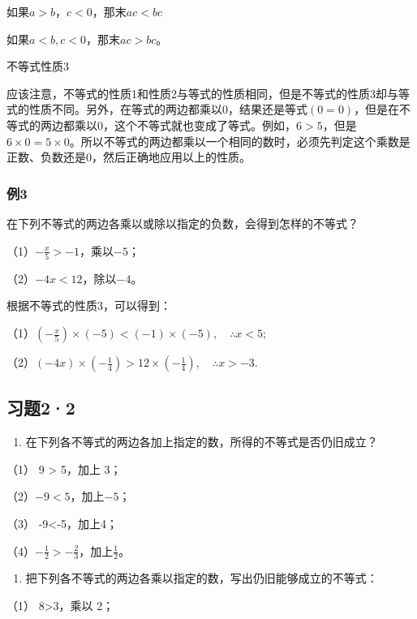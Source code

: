 如果\(a > b\)，\(c < 0\)，那末\(ac < bc\)

如果\(a < b, c < 0\)，那末\(ac > bc\)。

不等式性质3

应该注意，不等式的性质1和性质2与等式的性质相同，但是不等式的性质3却与等式的性质不同。另外，在等式的两边都乘以0，结果还是等式\((0 = 0)\)，但是在不等式的两边都乘以0，这个不等式就也变成了等式。例如，\(6 > 5\)，但是\(6 \times 0 = 5 \times 0\)。所以不等式的两边都乘以一个相同的数时，必须先判定这个乘数是正数、负数还是0，然后正确地应用以上的性质。

\subsubsection{例3}

在下列不等式的两边各乘以或除以指定的负数，会得到怎样的不等式？

（1）\(-\frac{x}{5} > -1\)，乘以\(-5\)；

（2）\(-4x < 12\)，除以\(-4\)。

 根据不等式的性质3，可以得到：

（1）\(\left(-\frac{x}{5}\right)\times(-5) < (-1) \times (-5), \quad \therefore x < 5;\)

（2）\((-4x) \times \left(-\frac{1}{4}\right) > 12 \times \left(-\frac{1}{4}\right), \quad \therefore x > -3.\)

\subsection{习题2·2}

\begin{enumerate}
\item
  在下列各不等式的两边各加上指定的数，所得的不等式是否仍旧成立？
\end{enumerate}

（1） 9 \textgreater{} 5，加上 3；

（2）\(-9 < 5\)，加上\(-5\)；

（3） -9\textless-5，加上4；

（4）\(-\frac{1}{2} > -\frac{2}{3}\)，加上\(\frac{1}{2}\)。

\begin{enumerate}[start=2]
\item
  把下列各不等式的两边各乘以指定的数，写出仍旧能够成立的不等式：
\end{enumerate}

（1） 8\textgreater3，乘以 2；

